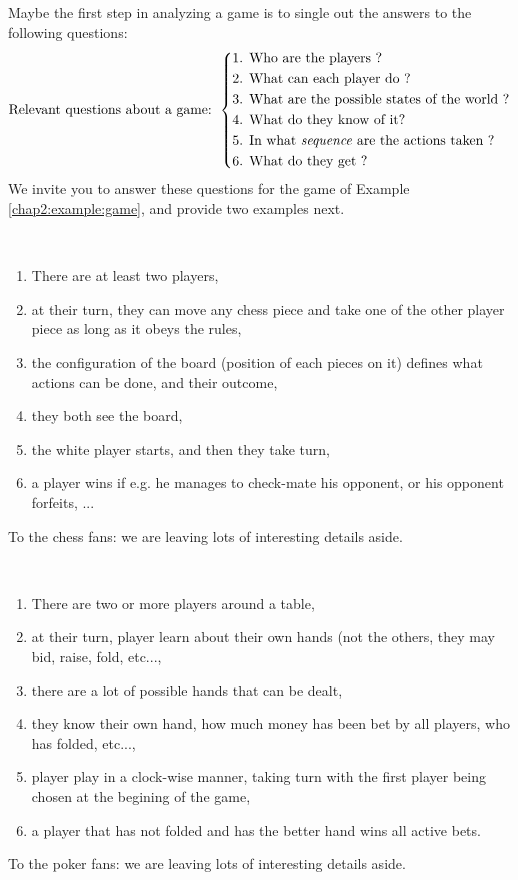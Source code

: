 Maybe the first step in analyzing a game is to single out the answers to the following questions:
\begin{equation*}
\text{Relevant questions about a game: }
\left \{
\begin{aligned}
& \text{{1. Who are the players ?}} \\
& \text{{2. What can each player do ?}} \\
&  \text{{3. What are the possible states of the world ?}}\\
& \text{{4. What do they know of it?}}\\
& \text{{5. In what \emph{sequence} are the actions taken ?}}\\
& \text{{6. What do they get ?}}
\end{aligned} \right.
\end{equation*}
We invite you to answer these questions for the game of Example \ref{chap2:example:game}, and provide two examples next.

\begin{example}
$\,$
\begin{enumerate}
\item There are at least two players,
\item at their turn, they can move any chess piece and take one of the other player piece as long as it obeys the rules,
\item the configuration of the board (position of each pieces on it) defines what actions can be done, and their outcome,
\item they both see the board,
\item the white player starts, and then they take turn,
\item a player wins if e.g. he manages to check-mate his opponent, or his opponent forfeits, ...
\end{enumerate}
To the chess fans: we are leaving lots of interesting details aside.
\end{example}
\begin{example}
$\,$
\begin{enumerate}
\item There are two or more players around a table,
\item at their turn, player learn about their own hands (not the others, they may bid, raise, fold, etc...,
\item there are a lot of possible hands that can be dealt,
\item they know their own hand, how much money has been bet by all players, who has folded, etc...,
\item player play in a clock-wise manner, taking turn with the first player being chosen at the begining of the game,
\item a player that has not folded and has the better hand wins all active bets.
\end{enumerate}
To the poker fans: we are leaving lots of interesting details aside.
\end{example}


